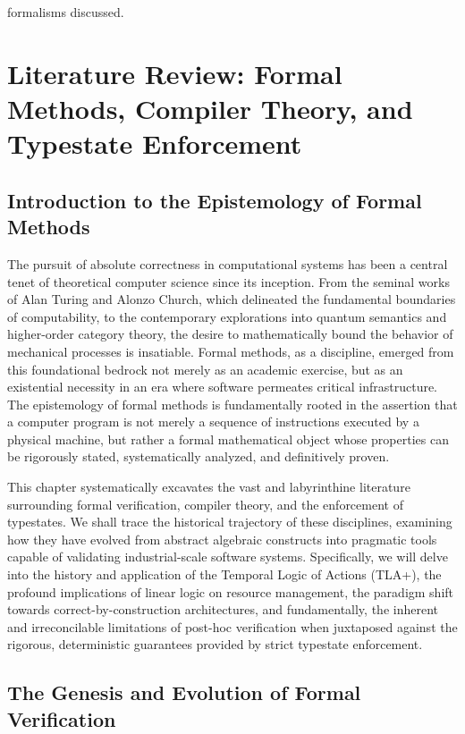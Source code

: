 formalisms discussed. \n\chapter{Literature Review: Formal Methods, Compiler Theory, and Typestate Enforcement}
\label{ch:lit_review_formal}

\section{Introduction to the Epistemology of Formal Methods}

The pursuit of absolute correctness in computational systems has been a central tenet of theoretical computer science since its inception. From the seminal works of Alan Turing and Alonzo Church, which delineated the fundamental boundaries of computability, to the contemporary explorations into quantum semantics and higher-order category theory, the desire to mathematically bound the behavior of mechanical processes is insatiable. Formal methods, as a discipline, emerged from this foundational bedrock not merely as an academic exercise, but as an existential necessity in an era where software permeates critical infrastructure. The epistemology of formal methods is fundamentally rooted in the assertion that a computer program is not merely a sequence of instructions executed by a physical machine, but rather a formal mathematical object whose properties can be rigorously stated, systematically analyzed, and definitively proven.

This chapter systematically excavates the vast and labyrinthine literature surrounding formal verification, compiler theory, and the enforcement of typestates. We shall trace the historical trajectory of these disciplines, examining how they have evolved from abstract algebraic constructs into pragmatic tools capable of validating industrial-scale software systems. Specifically, we will delve into the history and application of the Temporal Logic of Actions (TLA+), the profound implications of linear logic on resource management, the paradigm shift towards correct-by-construction architectures, and fundamentally, the inherent and irreconcilable limitations of post-hoc verification when juxtaposed against the rigorous, deterministic guarantees provided by strict typestate enforcement.

\section{The Genesis and Evolution of Formal Verification}

